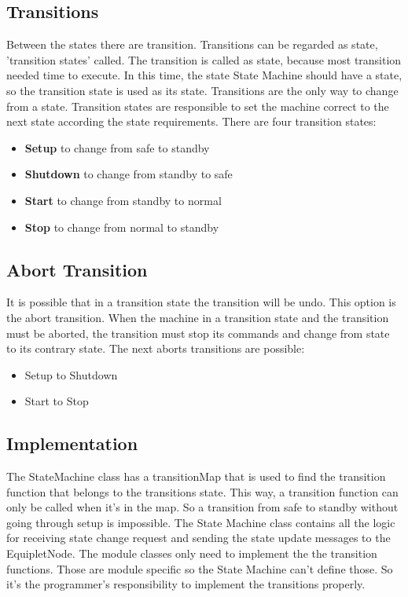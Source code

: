 \subsection{Transitions}
Between the states there are transition. Transitions can be regarded as state, 'transition states' called. The transition is called as state, because most transition needed time to execute. In this time, the state State Machine should have a state, so the transition state is used as its state. Transitions are the only way to change from a state. Transition states are responsible to set the machine correct to the next state according the state requirements.  
There are four transition states:
\begin{itemize}
\item \textbf{Setup} to change from safe to standby
\item \textbf{Shutdown} to change from standby to safe
\item \textbf{Start} to change from standby to normal
\item \textbf{Stop} to change from normal to standby
\end{itemize}

\subsection{Abort Transition}
It is possible that in a transition state the transition will be undo. This option is the abort transition. When the machine in a transition state and the transition must be aborted, the transition must stop its commands and change from state to its contrary state. 
The next aborts transitions are possible:
\begin{itemize}
\item Setup to Shutdown
\item Start to Stop
\end{itemize}

\subsection{Implementation}
The StateMachine class has a transitionMap that is used to find the transition function that belongs to the transitions state. This way, a transition function can only be called when it’s in the map. So a transition from safe to standby without going through setup is impossible. The State Machine class contains all the logic for receiving state change request and sending the state update messages to the EquipletNode. The module classes only need to implement the the transition functions. Those are module specific so the State Machine can’t define those. So it’s the programmer’s responsibility to implement the transitions properly.\cite{mast_technical_design}

